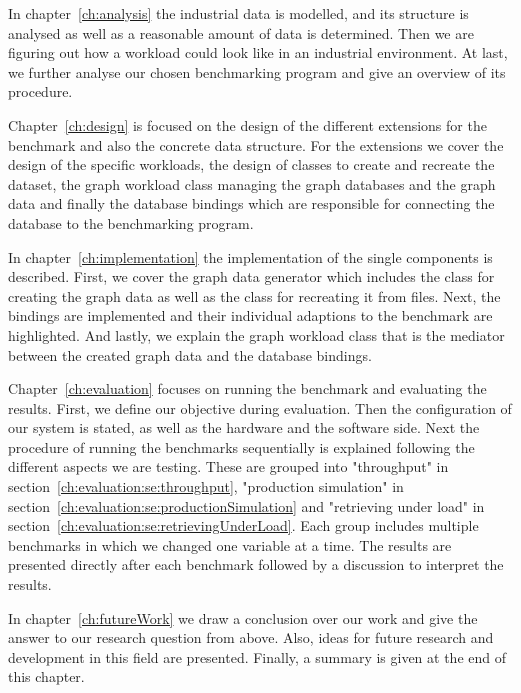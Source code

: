 In chapter~\ref{ch:analysis} the industrial data is modelled,
and its structure is analysed as well as a reasonable amount of data is determined.
Then we are figuring out how a workload could look like in an industrial environment.
At last,
we further analyse our chosen benchmarking program and give an overview of its procedure.

Chapter~\ref{ch:design} is focused on the design of the different extensions for the benchmark and also the concrete data structure.
For the extensions we cover the design of the specific workloads,
the design of classes to create and recreate the dataset,
the graph workload class managing the graph databases and the graph data and finally the database bindings which are responsible for connecting the database to the benchmarking program.

In chapter~\ref{ch:implementation} the implementation of the single components is described.
First,
we cover the graph data generator which includes the class for creating the graph data as well as the class for recreating it from files.
Next,
the bindings are implemented and their individual adaptions to the benchmark are highlighted.
And lastly,
we explain the graph workload class that is the mediator between the created graph data and the database bindings.

Chapter~\ref{ch:evaluation} focuses on running the benchmark and evaluating the results.
First, we define our objective during evaluation.
Then the configuration of our system is stated, as well as the hardware and the software side.
Next the procedure of running the benchmarks sequentially is explained following the different aspects we are testing.
These are grouped into "throughput" in section~\ref{ch:evaluation:se:throughput}, "production simulation" in section~\ref{ch:evaluation:se:productionSimulation} and "retrieving under load" in section~\ref{ch:evaluation:se:retrievingUnderLoad}.
Each group includes multiple benchmarks in which we changed one variable at a time.
The results are presented directly after each benchmark followed by a discussion to interpret the results.

In chapter~\ref{ch:futureWork} we draw a conclusion over our work and give the answer to our research question from above.
Also,
ideas for future research and development in this field are presented.
Finally,
a summary is given at the end of this chapter.
